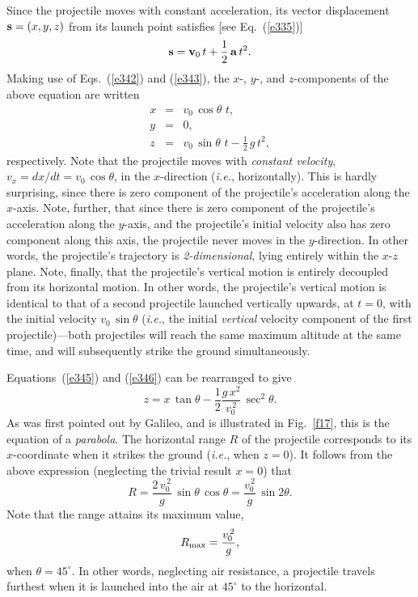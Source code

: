 Since the projectile moves with constant acceleration, its vector
displacement ${\bf s}=(x,y,z)$ from its launch point
satisfies [see Eq.~(\ref{e335})]
\begin{equation}
{\bf s} = {\bf v}_0\,t + \frac{1}{2}\,{\bf a}\,t^2.
\end{equation}
Making use of Eqs.~(\ref{e342}) and (\ref{e343}), the $x$-, $y$-, and $z$-components
of the above equation are written
\begin{eqnarray}
x &=& v_0\,\cos\theta\,\,t,\label{e345}\\[0.5ex]
y&=& 0,\\
z &=& v_0\,\sin\theta\,\,t - \frac{1}{2}\,g\,t^2,\label{e346}
\end{eqnarray}
respectively.
Note that the projectile moves with {\em constant velocity}, $v_x =dx/dt = v_0\,\cos\theta$,
in the $x$-direction ({\em i.e.}, horizontally). This is hardly surprising, since there
is zero component of the projectile's acceleration along the $x$-axis. Note, further,
that
since there is zero component of the projectile's acceleration along the $y$-axis, and
 the projectile's initial velocity also has zero component along this axis, 
the projectile never moves in the $y$-direction. In other words, the projectile's
trajectory is {\em 2-dimensional}, lying entirely within the $x$-$z$ plane. Note,
finally, that the projectile's vertical motion is entirely decoupled
from its horizontal motion. In other words, the projectile's vertical motion is
identical to that of a second projectile launched vertically upwards, at $t=0$,
with the initial velocity $v_0\,\sin\theta$ ({\em i.e.}, the
initial {\em vertical} velocity component of the first projectile)---both projectiles will reach the
same maximum altitude at the same time, and will subsequently  strike the ground simultaneously. 

Equations~(\ref{e345}) and (\ref{e346}) can be rearranged to give
\begin{equation}
z =x\, \tan\theta -\frac{1}{2}\frac{g\,x^2}{v_0^{\,2}}\,\sec^2\theta.
\end{equation}
As was first pointed out by Galileo, and is illustrated in Fig.~\ref{f17}, this is
the equation of a {\em parabola}. The horizontal range
$R$ of the projectile corresponds to its $x$-coordinate when it strikes the
ground ({\em i.e.}, when $z=0$). It follows from the above
expression (neglecting the trivial result $x=0$) that
\begin{equation}\label{range}
R = \frac{2\,v_0^{\,2}}{g}\,\sin\theta\,\cos\theta = 
\frac{v_0^{\,2}}{g}\,\sin 2\theta.
\end{equation}
Note that the range attains its maximum value,
\begin{equation}
R_{\rm max} =  \frac{v_0^{\,2}}{g},
\end{equation}
when $\theta=45^\circ$. In other words, neglecting air resistance, a projectile
travels furthest when it is launched into the air at $45^\circ$ to the horizontal. 

